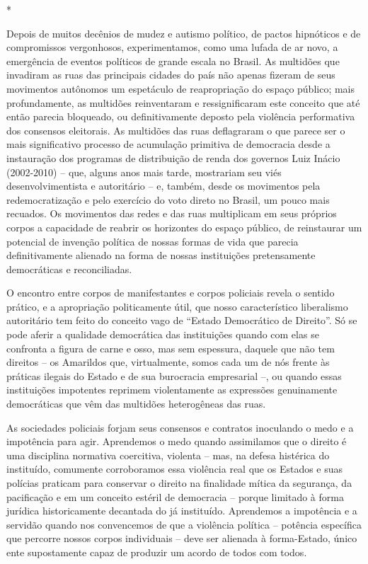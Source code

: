 *

Depois de muitos decênios de mudez e autismo político, de pactos
hipnóticos e de compromissos vergonhosos, experimentamos, como uma
lufada de ar novo, a emergência de eventos políticos de grande escala no
Brasil. As multidões que invadiram as ruas das principais cidades do
país não apenas fizeram de seus movimentos autônomos um espetáculo de
reapropriação do espaço público; mais profundamente, as multidões
reinventaram e ressignificaram este conceito que até então parecia
bloqueado, ou definitivamente deposto pela violência performativa dos
consensos eleitorais. As multidões das ruas deflagraram o que parece ser
o mais significativo processo de acumulação primitiva de democracia
desde a instauração dos programas de distribuição de renda dos governos
Luiz Inácio (2002-2010) -- que, alguns anos mais tarde, mostrariam seu
viés desenvolvimentista e autoritário -- e, também, desde os movimentos
pela redemocratização e pelo exercício do voto direto no Brasil, um
pouco mais recuados. Os movimentos das redes e das ruas multiplicam em
seus próprios corpos a capacidade de reabrir os horizontes do espaço
público, de reinstaurar um potencial de invenção política de nossas
formas de vida que parecia definitivamente alienado na forma de nossas
instituições pretensamente democráticas e reconciliadas.

O encontro entre corpos de manifestantes e corpos policiais revela o
sentido prático, e a apropriação politicamente útil, que nosso
característico liberalismo autoritário tem feito do conceito vago de
``Estado Democrático de Direito''. Só se pode aferir a qualidade
democrática das instituições quando com elas se confronta a figura de
carne e osso, mas sem espessura, daquele que não tem direitos -- os
Amarildos que, virtualmente, somos cada um de nós frente às práticas
ilegais do Estado e de sua burocracia empresarial --, ou quando essas
instituições impotentes reprimem violentamente as expressões
genuinamente democráticas que vêm das multidões heterogêneas das ruas.

As sociedades policiais forjam seus consensos e contratos inoculando o
medo e a impotência para agir. Aprendemos o medo quando assimilamos que
o direito é uma disciplina normativa coercitiva, violenta -- mas, na
defesa histérica do instituído, comumente corroboramos essa violência
real que os Estados e suas polícias praticam para conservar o direito na
finalidade mítica da segurança, da pacificação e em um conceito estéril
de democracia -- porque limitado à forma jurídica historicamente
decantada do já instituído. Aprendemos a impotência e a servidão quando
nos convencemos de que a violência política -- potência específica que
percorre nossos corpos individuais -- deve ser alienada à forma-Estado,
único ente supostamente capaz de produzir um acordo de todos com todos.

